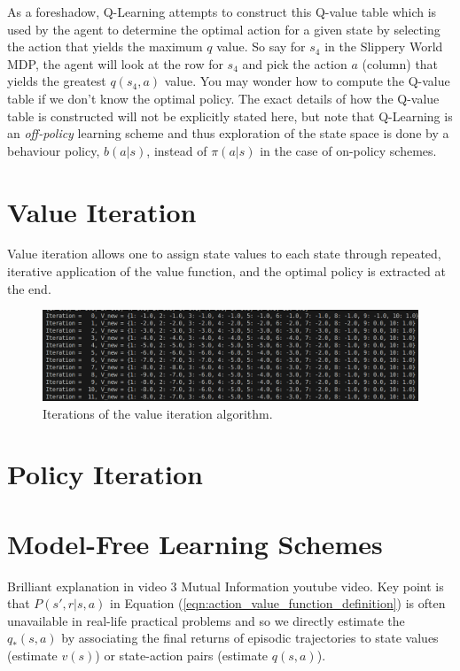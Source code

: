 \documentclass[a4paper,11pt]{article}
\begin{document}
As a foreshadow, Q-Learning attempts to construct this Q-value table which is used by the agent to determine the optimal action for a given state by selecting the action that yields the maximum $q$ value.  So say for $s_4$ in the Slippery World MDP, the agent will look at the row for $s_4$ and pick the action $a$ (column) that yields the greatest $q(s_4, a)$ value.  You may wonder how to compute the Q-value table if we don't know the optimal policy.  The exact details of how the Q-value table is constructed will not be explicitly stated here, but note that Q-Learning is an {\it off-policy} learning scheme and thus exploration of the state space is done by a behaviour policy, $b(a|s)$, instead of $\pi(a|s)$ in the case of on-policy schemes.



\section{Value Iteration}

Value iteration allows one to assign state values to each state through repeated, iterative application of the value function, and the optimal policy is extracted at the end.  



\begin{figure}
    \includegraphics[width=\textwidth]{images/iters-of-value-iteration-1d-grid-world-code-output.png}
    \caption{Iterations of the value iteration algorithm.}
    \label{fig:iters-of-value-iteration-1d-grid-world-code-output}
\end{figure}


\section{Policy Iteration}


\section{Model-Free Learning Schemes}

Brilliant explanation in video 3 Mutual Information youtube video.  Key point is that $P(s',r|s,a)$ in Equation (\ref{eqn:action_value_function_definition}) is often unavailable in real-life practical problems and so we directly estimate the $q_*(s,a)$ by associating the final returns of episodic trajectories to state values (estimate $v(s)$) or state-action pairs (estimate $q(s,a)$).
\end{document}
